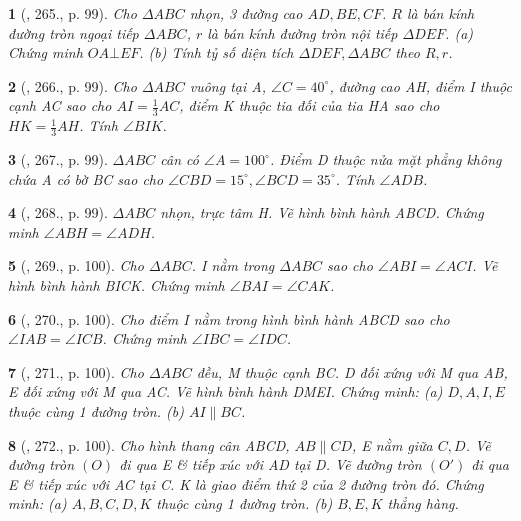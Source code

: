 \documentclass{article}
\newtheorem{baitoan}{}
\begin{document}
\begin{baitoan}[\cite{Binh_Toan_9_tap_2}, 265., p. 99]
	Cho $\Delta ABC$ nhọn, 3 đường cao $AD,BE,CF$. $R$ là bán kính đường tròn ngoại tiếp $\Delta ABC$, $r$ là bán kính đường tròn nội tiếp $\Delta DEF$. (a) Chứng minh $OA\bot EF$. (b) Tính tỷ số diện tích $\Delta DEF,\Delta ABC$ theo $R,r$.
\end{baitoan}

\begin{baitoan}[\cite{Binh_Toan_9_tap_2}, 266., p. 99]
	Cho $\Delta ABC$ vuông tại A, $\angle{C} = 40^\circ$, đường cao AH, điểm I thuộc cạnh AC sao cho $AI = \frac{1}{3}AC$, điểm K thuộc tia đối của tia HA sao cho $HK = \frac{1}{3}AH$. Tính $\angle{BIK}$.
\end{baitoan}

\begin{baitoan}[\cite{Binh_Toan_9_tap_2}, 267., p. 99]
	$\Delta ABC$ cân có $\angle{A} = 100^\circ$. Điểm D thuộc nửa mặt phẳng không chứa A có bờ BC sao cho $\angle{CBD} = 15^\circ,\angle{BCD} = 35^\circ$. Tính $\angle{ADB}$.
\end{baitoan}

\begin{baitoan}[\cite{Binh_Toan_9_tap_2}, 268., p. 99]
	$\Delta ABC$ nhọn, trực tâm H. Vẽ hình bình hành ABCD. Chứng minh $\angle{ABH} = \angle{ADH}$.
\end{baitoan}

\begin{baitoan}[\cite{Binh_Toan_9_tap_2}, 269., p. 100]
	Cho $\Delta ABC$. I nằm trong $\Delta ABC$ sao cho $\angle{ABI} = \angle{ACI}$. Vẽ hình bình hành BICK. Chứng minh $\angle{BAI} = \angle{CAK}$.
\end{baitoan}

\begin{baitoan}[\cite{Binh_Toan_9_tap_2}, 270., p. 100]
	Cho điểm I nằm trong hình bình hành ABCD sao cho $\angle{IAB} = \angle{ICB}$. Chứng minh $\angle{IBC} = \angle{IDC}$.
\end{baitoan}

\begin{baitoan}[\cite{Binh_Toan_9_tap_2}, 271., p. 100]
	Cho $\Delta ABC$ đều, M thuộc cạnh BC. D đối xứng với M qua AB, E đối xứng với M qua AC. Vẽ hình bình hành DMEI. Chứng minh: (a) $D,A,I,E$ thuộc cùng 1 đường tròn. (b) $AI\parallel BC$.
\end{baitoan}

\begin{baitoan}[\cite{Binh_Toan_9_tap_2}, 272., p. 100]
	Cho hình thang cân ABCD, $AB\parallel CD$, E nằm giữa $C,D$. Vẽ đường tròn $(O)$ đi qua E \& tiếp xúc với AD tại D. Vẽ đường tròn $(O')$ đi qua E \& tiếp xúc với AC tại C. K là giao điểm thứ 2 của 2 đường tròn đó. Chứng minh: (a) $A,B,C,D,K$ thuộc cùng 1 đường tròn. (b) $B,E,K$ thẳng hàng.
\end{baitoan}
\end{document}
